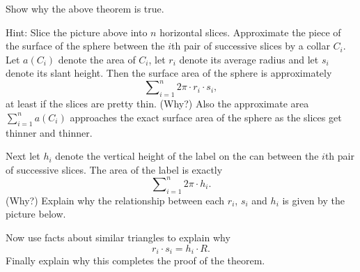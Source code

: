 \documentclass{ximera}
\begin{document}
\begin{exercise}
Show why the above theorem is true.

Hint: Slice the picture above into $n$ horizontal slices. Approximate
the piece of the surface of the sphere between the $i$th pair of
successive slices by a collar $C_{i}$. Let $a\left( C_{i}\right) $
denote the area of $C_{i}$, let $r_{i}$ denote its average radius and
let $s_{i}$ denote its slant height. Then the surface area of the
sphere is approximately%
\[%
{\displaystyle\sum\nolimits_{i=1}^{n}}
2\pi\cdot r_{i}\cdot s_{i},
\]
at least if the slices are pretty thin. (Why?) Also the approximate area $%
{\displaystyle\sum\nolimits_{i=1}^{n}}
a\left(  C_{i}\right)  $ approaches the exact surface area of the sphere as
the slices get thinner and thinner.

Next let $h_{i}$ denote the vertical height of the label on the can between
the $i$th pair of successive slices. The area of the label is exactly%
\[%
{\displaystyle\sum\nolimits_{i=1}^{n}}
2\pi\cdot h_{i}.
\]
(Why?) Explain why the relationship between each $r_{i}$, $s_{i}$ and $h_{i}$
is given by the picture below.
\begin{image}
\end{image}
Now use facts about similar triangles to explain why
\[
r_{i}\cdot s_{i}=h_{i}\cdot R.
\]
Finally explain why this completes the proof of the theorem.
\end{exercise}
\end{document}
